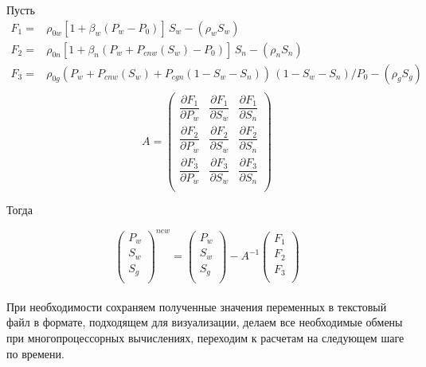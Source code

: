 Пусть
\begin{equation}
  \begin{aligned}
    F_1=&\rho_{0w}[1+\beta_w (P_w-P_0)]\, S_w-(\rho_w S_w) \\
    F_2=&\rho_{0n}[1+\beta_n (P_w+P_{cnw}(S_w)-P_0)]\, S_n-(\rho_n S_n) \\
    F_3=&\rho_{0g}(P_w+P_{cnw}(S_w)+P_{cgn}(1-S_w-S_n))\, (1-S_w-S_n)/P_0-(\rho_g S_g) \\
  \end{aligned}
\end{equation}
\begin{equation}
A=
\begin{pmatrix}
\dfrac{\partial{F_1}}{\partial{P_w}} & \dfrac{\partial{F_1}}{\partial{S_w}} & \dfrac{\partial{F_1}}{\partial{S_n}}\\[3mm]
\dfrac{\partial{F_2}}{\partial{P_w}} & \dfrac{\partial{F_2}}{\partial{S_w}} & \dfrac{\partial{F_2}}{\partial{S_n}}\\[3mm]
\dfrac{\partial{F_3}}{\partial{P_w}} & \dfrac{\partial{F_3}}{\partial{S_w}} & \dfrac{\partial{F_3}}{\partial{S_n}}\\[3mm]
\end{pmatrix}
\end{equation}

Тогда

\begin{equation}
\begin{pmatrix}
P_w\\
S_w\\
S_g\\
\end{pmatrix}^{new}
=
\begin{pmatrix}
P_w\\
S_w\\
S_g\\
\end{pmatrix}
-A^{-1}
\begin{pmatrix}
F_1\\
F_2\\
F_3\\
\end{pmatrix}
\end{equation}\\

При необходимости сохраняем полученные значения переменных в текстовый файл
в формате, подходящем для визуализации, делаем все необходимые обмены при 
многопроцессорных вычислениях, переходим к расчетам на следующем шаге по 
времени.
